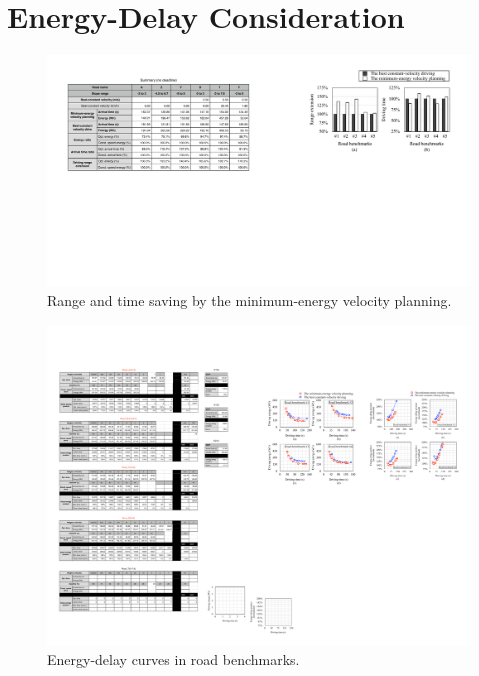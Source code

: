 \documentclass{IEEEtran}
\begin{document}
\section{Energy-Delay Consideration} \label{sec:ed_consideration}
\begin{figure}	 %
\includegraphics[width=1.0\hsize]{Figures/no_deadline_bar.pdf}
\caption{Range and time saving by the minimum-energy velocity planning.}
\label{fig:no_deadline_bar}
\end{figure} 


\begin{figure} 	%
\centering
\includegraphics[width=\hsize]{Figures/ED_curve.pdf}
\caption{Energy-delay curves in road benchmarks.}
\label{fig:energy_delay_curve}
\end{figure} 
\end{document}
